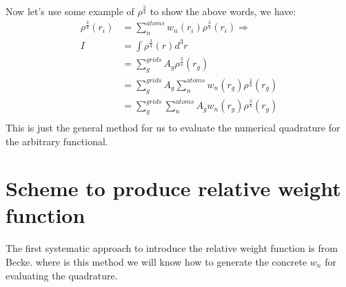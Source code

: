 Now let's use some example of $\rho^{\frac{3}{4}}$ to show the above
words, we have:
\begin{equation}
\label{NQM_general_eq}
\begin{split}
 \rho^{\frac{3}{4}}(r_{i}) &= \sum^{atoms}_{n} w_{n}(r_{i})
\rho^{\frac{3}{4}}(r_{i}) \Rightarrow  \\
I &= \int \rho^{\frac{3}{4}}(r) d^{3}r \\
  &= \sum^{grids}_{g} A_{g}\rho^{\frac{3}{4}}(r_{g}) \\
  &= \sum^{grids}_{g} A_{g} \sum^{atoms}_{n}
w_{n}(r_{g})\rho^{\frac{3}{4}}(r_{g}) \\
  &= \sum^{grids}_{g}\sum^{atoms}_{n}A_{g} 
w_{n}(r_{g})\rho^{\frac{3}{4}}(r_{g}) \\
\end{split}
\end{equation}
This is just the general method for us to evaluate the numerical
quadrature for the arbitrary functional. 




\section{Scheme to produce relative weight function}\label{weight_function_dft} 

The first systematic approach to introduce the relative weight
function is from Becke\cite{Becke}. where is this method we will know
how to generate the concrete $w_{n}$ for evaluating the quadrature. 

